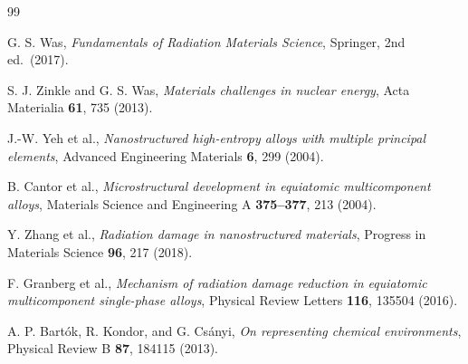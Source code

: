 \documentclass[11pt]{article}
\begin{document}
\begin{thebibliography}{99}

G. S. Was, \textit{Fundamentals of Radiation Materials Science},
Springer, 2nd ed.\ (2017).

S. J. Zinkle and G. S. Was,
\textit{Materials challenges in nuclear energy},
Acta Materialia \textbf{61}, 735 (2013).

J.-W. Yeh et al.,
\textit{Nanostructured high-entropy alloys with multiple principal elements},
Advanced Engineering Materials \textbf{6}, 299 (2004).

B. Cantor et al.,
\textit{Microstructural development in equiatomic multicomponent alloys},
Materials Science and Engineering A \textbf{375--377}, 213 (2004).

Y. Zhang et al.,
\textit{Radiation damage in nanostructured materials},
Progress in Materials Science \textbf{96}, 217 (2018).

F. Granberg et al.,
\textit{Mechanism of radiation damage reduction in equiatomic multicomponent
single-phase alloys},
Physical Review Letters \textbf{116}, 135504 (2016).

A. P. Bartók, R. Kondor, and G. Csányi,
\textit{On representing chemical environments},
Physical Review B \textbf{87}, 184115 (2013).

\end{thebibliography}
\end{document}
